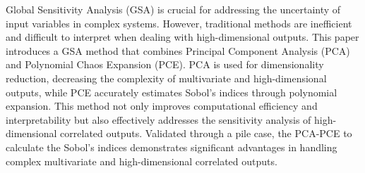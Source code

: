 Global Sensitivity Analysis (GSA) is crucial for addressing the uncertainty of input variables in complex systems. However, traditional methods are inefficient and difficult to interpret when dealing with high-dimensional outputs. This paper introduces a GSA method that combines Principal Component Analysis (PCA) and Polynomial Chaos Expansion (PCE). PCA is used for dimensionality reduction, decreasing the complexity of multivariate and high-dimensional outputs, while PCE accurately estimates Sobol's indices through polynomial expansion. This method not only improves computational efficiency and interpretability but also effectively addresses the sensitivity analysis of high-dimensional correlated outputs. Validated through a pile case, the PCA-PCE to calculate the Sobol's indices demonstrates significant advantages in handling complex multivariate and high-dimensional correlated outputs.





